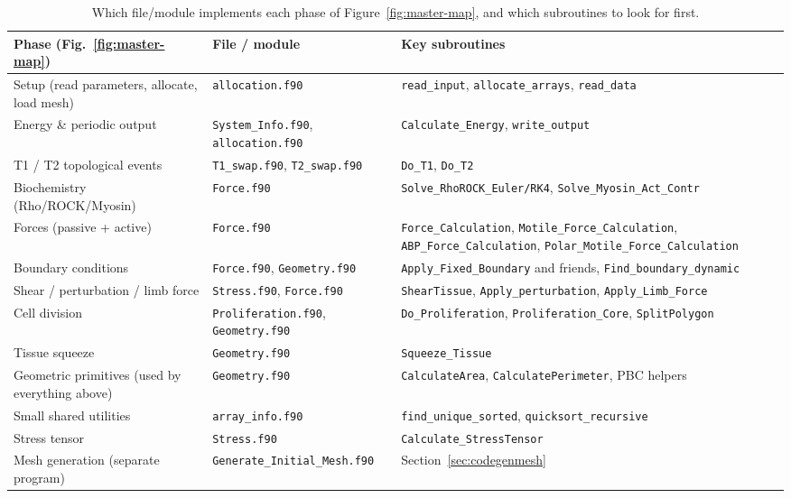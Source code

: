 \documentclass[11pt]{article}
\begin{document}
\begin{table}[htbp]
\centering
\small
\begin{tabular}{@{}p{}p{}p{}@{}}
\toprule
\textbf{Phase (Fig.~\ref{fig:master-map})} & \textbf{File / module} & \textbf{Key subroutines} \\
\midrule
Setup (read parameters, allocate, load mesh) & \texttt{allocation.f90} & \texttt{read\_input}, \texttt{allocate\_arrays}, \texttt{read\_data} \\
Energy \& periodic output & \texttt{System\_Info.f90}, \texttt{allocation.f90} & \texttt{Calculate\_Energy}, \texttt{write\_output} \\
T1 / T2 topological events & \texttt{T1\_swap.f90}, \texttt{T2\_swap.f90} & \texttt{Do\_T1}, \texttt{Do\_T2} \\
Biochemistry (Rho/ROCK/Myosin) & \texttt{Force.f90} & \texttt{Solve\_RhoROCK\_Euler/RK4}, \texttt{Solve\_Myosin\_Act\_Contr} \\
Forces (passive + active) & \texttt{Force.f90} & \texttt{Force\_Calculation}, \texttt{Motile\_Force\_Calculation}, \texttt{ABP\_Force\_Calculation}, \texttt{Polar\_Motile\_Force\_Calculation} \\
Boundary conditions & \texttt{Force.f90}, \texttt{Geometry.f90} & \texttt{Apply\_Fixed\_Boundary} and friends, \texttt{Find\_boundary\_dynamic} \\
Shear / perturbation / limb force & \texttt{Stress.f90}, \texttt{Force.f90} & \texttt{ShearTissue}, \texttt{Apply\_perturbation}, \texttt{Apply\_Limb\_Force} \\
Cell division & \texttt{Proliferation.f90}, \texttt{Geometry.f90} & \texttt{Do\_Proliferation}, \texttt{Proliferation\_Core}, \texttt{SplitPolygon} \\
Tissue squeeze & \texttt{Geometry.f90} & \texttt{Squeeze\_Tissue} \\
Geometric primitives (used by everything above) & \texttt{Geometry.f90} & \texttt{CalculateArea}, \texttt{CalculatePerimeter}, PBC helpers \\
Small shared utilities & \texttt{array\_info.f90} & \texttt{find\_unique\_sorted}, \texttt{quicksort\_recursive} \\
Stress tensor & \texttt{Stress.f90} & \texttt{Calculate\_StressTensor} \\
Mesh generation (separate program) & \texttt{Generate\_Initial\_Mesh.f90} & Section~\ref{sec:codegenmesh} \\
\bottomrule
\end{tabular}
\caption{Which file/module implements each phase of Figure~\ref{fig:master-map}, and
which subroutines to look for first.}
\label{tab:module-map}
\end{table}
\end{document}
